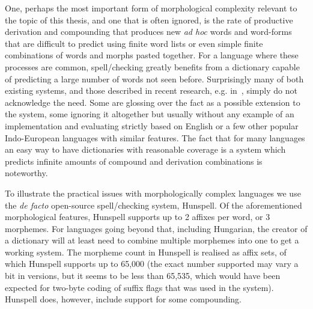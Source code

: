 \documentclass[officiallayout,final]{unihelcompling}
\begin{document}
One, perhaps the most important form of morphological complexity relevant to
the topic of this thesis, and one that is often ignored, is the rate of
productive derivation and compounding that produces new \emph{ad hoc} words and
word-forms that are difficult to predict using finite word lists or even simple
finite combinations of words and morphs pasted together.  For a language where
these processes are common, spell\-/checking greatly benefits from a dictionary
capable of predicting a large number of words not seen before. Surprisingly
many of both existing systems, and those described in recent research, e.g.
in~\cite{hassan2008language,watson2003new}, simply do not acknowledge the need.
Some are glossing over the fact as a possible extension to the system, some
ignoring it altogether but usually without any example of an implementation and
evaluating strictly based on English or a few other popular Indo-European
languages with similar features. The fact that for many languages an easy way
to have dictionaries with reasonable coverage is a system which predicts
infinite amounts of compound and derivation combinations is noteworthy.

To illustrate the practical issues with morphologically complex languages we
use the \emph{de facto} open-source spell\-/checking system, Hunspell. Of the
aforementioned morphological features, Hunspell supports up to 2 affixes per
word, or 3 morphemes. For languages going beyond that, including Hungarian, the
creator of a dictionary will at least need to combine multiple morphemes into
one to get a working system. The morpheme count in Hunspell is realised as
affix sets, of which Hunspell supports up to 65,000 (the exact number supported
may vary a bit in versions, but it seems to be less than 65,535, which would
have been expected for two-byte coding of suffix flags that was used in the
system). Hunspell does, however, include support for some compounding.
\end{document}
